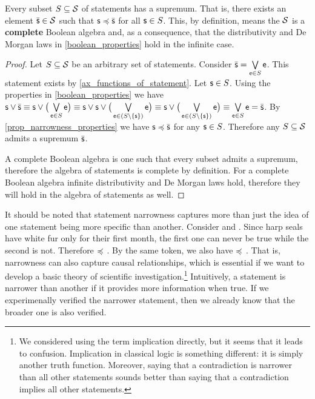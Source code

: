 \documentclass[11pt,letterpaper,fleqn]{memoir} %
\begin{document}
\begin{mathSection}
\begin{prop}
	Every subset $S \subseteq \stmtSet$ of statements has a supremum. That is, there exists an element $\bar{\stmt} \in \stmtSet$ such that $\stmt \narrower \bar{\stmt}$ for all $\stmt \in S$. This, by definition, means the $\stmtSet$ is a \textbf{complete} Boolean algebra and, as a consequence, that the distributivity and De Morgan laws in \ref{boolean_properties} hold in the infinite case.
\end{prop}

\begin{proof}
	Let $S \subseteq \stmtSet$ be an arbitrary set of statements. Consider $\bar{\stmt}=\bigOR\limits_{\stmt[e] \in S} \stmt[e]$. This statement exists by \ref{ax_functions_of_statement}. Let $\stmt \in S$. Using the properties in \ref{boolean_properties} we have $\stmt \OR \bar{\stmt} \equiv \stmt \OR \big(\bigOR\limits_{\stmt[e] \in S} \stmt[e] \big) \equiv \stmt \OR \stmt \OR \big(\bigOR\limits_{\stmt[e] \in (S \setminus \{\stmt\})} \stmt[e] \big) \equiv \stmt \OR \big(\bigOR\limits_{\stmt[e] \in (S \setminus \{\stmt\})} \stmt[e] \big) \equiv \bigOR\limits_{\stmt[e] \in S} \stmt[e] = \bar{\stmt}$. By \ref{prop_narrowness_properties} we have $\stmt \narrower \bar{\stmt}$ for any $\stmt \in S$. Therefore any $S \subseteq \stmtSet$ admits a supremum $\bar{\stmt}$.
	
	A complete Boolean algebra is one such that every subset admits a supremum, therefore the algebra of statements is complete by definition. For a complete Boolean algebra infinite distributivity and De Morgan laws hold, therefore they will hold in the algebra of statements as well.
\end{proof}

\end{mathSection}

It should be noted that statement narrowness captures more than just the idea of one statement being more specific than another. Consider  and . Since harp seals have white fur only for their first month, the first one can never be true while the second is not. Therefore  $\narrower$ . By the same token, we also have  $\narrower$ . That is, narrowness can also capture causal relationships, which is essential if we want to develop a basic theory of scientific investigation.\footnote{We considered using the term implication directly, but it seems that it leads to confusion. Implication in classical logic is something different: it is simply another truth function. Moreover, saying that a contradiction is narrower than all other statements sounds better than saying that a contradiction implies all other statements.} Intuitively, a statement is narrower than another if it provides more information when true. If we experimenally verified the narrower statement, then we already know that the broader one is also verified.
\end{document}
